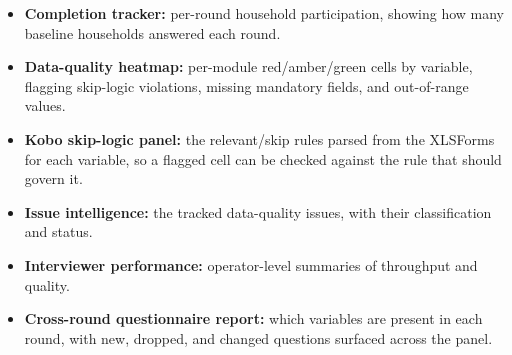 \begin{itemize}
  \item \textbf{Completion tracker:} per-round household participation, showing
        how many baseline households answered each round.
  \item \textbf{Data-quality heatmap:} per-module red/amber/green cells by
        variable, flagging skip-logic violations, missing mandatory fields, and
        out-of-range values.
  \item \textbf{Kobo skip-logic panel:} the relevant/skip rules parsed from the
        XLSForms for each variable, so a flagged cell can be checked against the
        rule that should govern it.
  \item \textbf{Issue intelligence:} the tracked data-quality issues, with their
        classification and status.
  \item \textbf{Interviewer performance:} operator-level summaries of throughput
        and quality.
  \item \textbf{Cross-round questionnaire report:} which variables are present in
        each round, with new, dropped, and changed questions surfaced across the
        panel.
\end{itemize}
